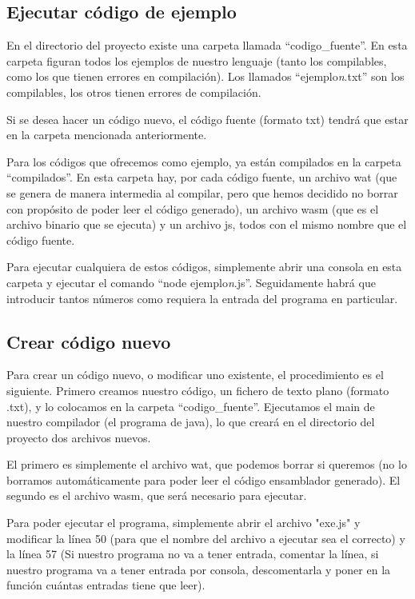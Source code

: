 \documentclass{article}
\begin{document}
\subsection{Ejecutar código de ejemplo}
En el directorio del proyecto existe una carpeta llamada ``codigo\_fuente''. En esta carpeta figuran todos los ejemplos de nuestro lenguaje (tanto los compilables, como los que tienen errores en compilación). Los llamados ``ejemplo\textit{n}.txt'' son los compilables, los otros tienen errores de compilación.

Si se desea hacer un código nuevo, el código fuente (formato txt) tendrá que estar en la carpeta mencionada anteriormente.

Para los códigos que ofrecemos como ejemplo, ya están compilados en la carpeta ``compilados''. En esta carpeta hay, por cada código fuente, un archivo wat (que se genera de manera intermedia al compilar, pero que hemos decidido no borrar con propósito de poder leer el código generado), un archivo wasm (que es el archivo binario que se ejecuta) y un archivo js, todos con el mismo nombre que el código fuente.

Para ejecutar cualquiera de estos códigos, simplemente abrir una consola en esta carpeta y ejecutar el comando ``node ejemplo\textit{n}.js''. Seguidamente habrá que introducir tantos números como requiera la entrada del programa en particular.

\subsection{Crear código nuevo}
Para crear un código nuevo, o modificar uno existente, el procedimiento es el siguiente. Primero creamos nuestro código, un fichero de texto plano (formato .txt), y lo colocamos en la carpeta ``codigo\_fuente''. Ejecutamos el main de nuestro compilador (el programa de java), lo que creará en el directorio del proyecto dos archivos nuevos.

El primero es simplemente el archivo wat, que podemos borrar si queremos (no lo borramos automáticamente para poder leer el código ensamblador generado). El segundo es el archivo wasm, que será necesario para ejecutar.

Para poder ejecutar el programa, simplemente abrir el archivo "exe.js" y modificar la línea 50 (para que el nombre del archivo a ejecutar sea el correcto) y la línea 57 (Si nuestro programa no va a tener entrada, comentar la línea, si nuestro programa va a tener entrada por consola, descomentarla y poner en la función cuántas entradas tiene que leer).
\end{document}
